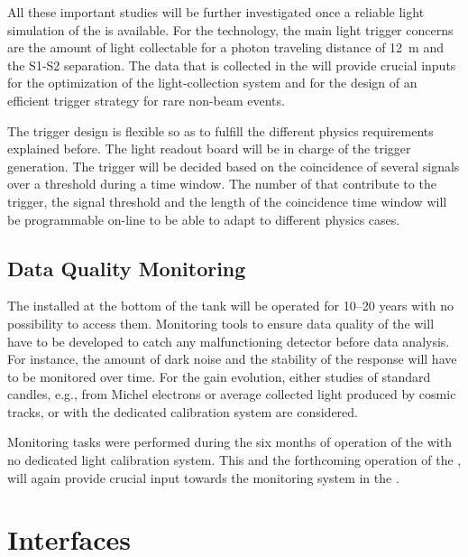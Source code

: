 All these important studies will be further investigated once a reliable light simulation of the  is available. For the \dual  technology, the main light trigger concerns are the amount of light collectable for a photon traveling distance of \SI{12}{m} and the S1-S2 separation. The data that is collected in the  will provide crucial inputs for the optimization of the  light-collection system and for the design of an efficient trigger strategy for rare non-beam events. 

The  trigger design is flexible so as to fulfill the different physics requirements explained before. The light readout  board will be in charge of the  trigger generation. The trigger will be decided based on the coincidence of several  signals over a threshold during a time window. The number of  that contribute to the trigger, the signal threshold and the length of the coincidence time window will be programmable on-line to be able to adapt to different physics cases.


\subsection{Data Quality Monitoring}
\label{sec:fddp-pd-7.3}

The  installed at the bottom of the tank will be operated for \numrange{10}{20} years with no possibility to access them. Monitoring tools to ensure data quality of the  will have to be developed to catch any malfunctioning detector before data analysis. For instance, the amount of dark noise and the stability of the  response will have to be monitored over time. For the gain evolution, either studies of standard candles, e.g., from Michel electrons or average collected light produced by cosmic tracks, or with the dedicated calibration system are considered.

Monitoring tasks were performed during the six months of operation of the  with no dedicated light calibration system. This and the forthcoming operation of the , will again provide crucial input towards the  monitoring system in the .

\section{Interfaces}
\label{sec:fddp-pd-8}

